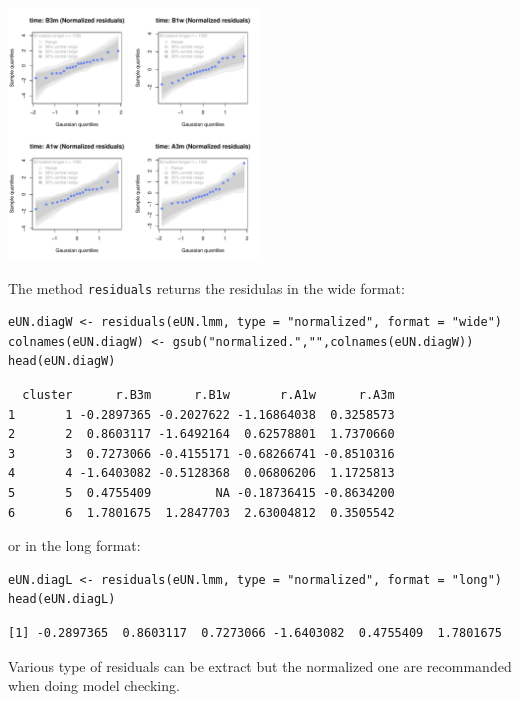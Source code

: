 \documentclass[12pt]{article}
\begin{document}
\begin{center}
\includegraphics[width=0.5\textwidth]{./figures/diag-qqplot.pdf}
\end{center}

\clearpage

The method \texttt{residuals} returns the residulas in the wide format:
\lstset{language=r,label= ,caption= ,captionpos=b,numbers=none}
\begin{lstlisting}
eUN.diagW <- residuals(eUN.lmm, type = "normalized", format = "wide")
colnames(eUN.diagW) <- gsub("normalized.","",colnames(eUN.diagW))
head(eUN.diagW)
\end{lstlisting}

\begin{verbatim}
  cluster      r.B3m      r.B1w       r.A1w      r.A3m
1       1 -0.2897365 -0.2027622 -1.16864038  0.3258573
2       2  0.8603117 -1.6492164  0.62578801  1.7370660
3       3  0.7273066 -0.4155171 -0.68266741 -0.8510316
4       4 -1.6403082 -0.5128368  0.06806206  1.1725813
5       5  0.4755409         NA -0.18736415 -0.8634200
6       6  1.7801675  1.2847703  2.63004812  0.3505542
\end{verbatim}


or in the long format:
\lstset{language=r,label= ,caption= ,captionpos=b,numbers=none}
\begin{lstlisting}
eUN.diagL <- residuals(eUN.lmm, type = "normalized", format = "long")
head(eUN.diagL)
\end{lstlisting}

\begin{verbatim}
[1] -0.2897365  0.8603117  0.7273066 -1.6403082  0.4755409  1.7801675
\end{verbatim}


Various type of residuals can be extract but the normalized one are
recommanded when doing model checking.
\end{document}
